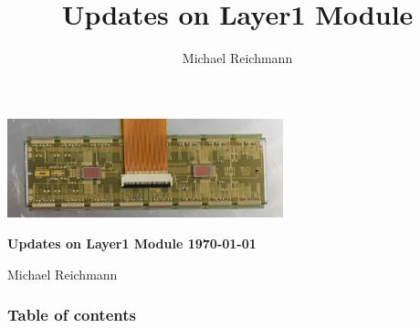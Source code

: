 \documentclass[9pt]{beamer}
\title[Layer1 Module]{Updates on Layer1 Module}
\author[M. Reichmann]{Michael Reichmann}
\institute[\textbf{\textit{ETH}}\scalebox{.6}{\textit{Z\"{u}rich}}]{Swiss Federal Institute of Technology Zurich}
\begin{document}
\begin{frame}
	\begin{center}
		\includegraphics[width=8cm]{Mod}
	\end{center}
	\begin{alertblock}{
		\begin{center}
			\textbf{Updates on Layer1 Module \today}
		\end{center}}
		\vspace*{10pt}
		\begin{center}\small
		Michael Reichmann
		\end{center}\normalsize
	\end{alertblock}
\end{frame}
\begin{frame}[allowframebreaks]
	\frametitle{Table of contents}
	\tableofcontents   %
\end{frame}
\end{document}
